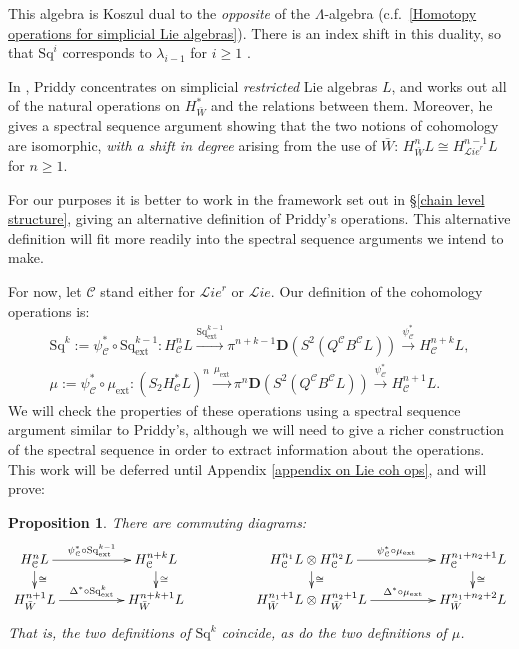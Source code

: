 \documentclass[11pt]{amsart} \renewcommand{\baselinestretch}{1.2}
\theoremstyle{plain}
\newtheorem{prop}[thm]{Proposition}
\numberwithin{equation}{section} %
\theoremstyle{plain}
\newtheorem{prop}[thm]{Proposition}
\numberwithin{equation}{chapter} %
\renewcommand{\to}{\longrightarrow}
\newcommand{\scrL}{\mathscr{L}}
\newcommand{\calc}{\mathcal{C}}
\newcommand{\citeBOX}[2][]{\cite[\mbox{#1}]{#2}}
\newcommand{\ExtCohOp}{\mathrm{Sq}_\mathrm{ext}}
\newcommand{\ExtCohProd}{\mu_\mathrm{ext}}
\newcommand{\Sq}{\mathrm{Sq}}
\newcommand{\liealgs}{{\scrL\!\textit{ie}}}
\newcommand{\restliealgs}{{\scrL\!\textit{ie}^\textit{r}}}
\newcommand{\dual}{\mathbf{D}}
\begin{document}
\begin{Constructing cohomology operations}
This algebra is Koszul dual to the \emph{opposite} of the $\Lambda$-algebra (c.f.\ \ref{Homotopy operations for simplicial Lie algebras}). There is an index shift in this duality, so that $\Sq^i$ corresponds to $\lambda_{i-1}$ for $i\geq1$ \citeBOX[\S7.1]{PriddyKoszul.pdf}.

In \cite{PriddySimplicialLie.pdf}, Priddy concentrates on simplicial \emph{restricted} Lie algebras $L$, and works out all of the natural operations on $H^*_{\bar{W}}$ and the relations between them. Moreover, he gives a spectral sequence argument showing that the two notions of cohomology are isomorphic, \emph{with a shift in degree} arising from the use of $\bar{W}$: $H_{\bar{W}}^nL\cong H^{n-1}_{\restliealgs}L$ for $n\geq1$.

For our purposes it is better to work in the framework set out in \S\ref{chain level structure}, giving an alternative definition of Priddy's operations. This alternative definition will fit more readily into the spectral sequence arguments we intend to make. 

For now, let $\calc$ stand either for $\restliealgs$ or $\liealgs$. Our definition of the cohomology operations is:
\begin{gather*}
\Sq^k:=\psi^*_{\calc}\circ\ExtCohOp^{k-1}:H_\calc^{n}L\overset{\ExtCohOp^{k-1}}{\to} \pi^{n+k-1}\dual(S^2(Q^\calc B^\calc L))\overset{\psi_\calc^*}{\to} H_\calc^{n+k}L,\\
\mu:=\psi^*_{\calc}\circ\ExtCohProd:(S_2 H_\calc^{*}L)^{n}\overset{\ExtCohProd}{\to} \pi^{n}\dual(S^2(Q^\calc B^\calc L))\overset{\psi_\calc^*}{\to} H_\calc^{n+1}L.
\end{gather*}
We will check the properties of these operations using a spectral sequence argument similar to Priddy's, although we will need to give a richer construction of the spectral sequence in order to extract information about the operations. This work will be deferred until Appendix \ref{appendix on Lie coh ops}, and will prove:
\begin{prop}
\label{all the lie steenrod ops are the same}
There are commuting diagrams:
\[\xymatrix@R=4mm@C=17mm{
H^n_\calc L
\ar[d]^-{\cong}
\ar[r]^-{\psi^*_{\calc}\circ\ExtCohOp^{k-1}}&%
H^{n+k}_\calc L
\ar[d]^-{\cong}
&
H^{n_1}_\calc L\otimes H^{n_2}_\calc L
\ar[d]^-{\cong}
\ar[r]^-{\psi^*_{\calc}\circ\ExtCohProd}&%
H^{n_1+n_2+1}_\calc L
\ar[d]^-{\cong}
\\%
H^{n+1}_{\bar{W}} L
\ar[r]^-{\Delta^*\circ\ExtCohOp^k}&%
H^{n+k+1}_{\bar{W}} L%
&
H^{n_1+1}_{\bar{W}} L\otimes H^{n_2+1}_{\bar{W}} L
\ar[r]^-{\Delta^*\circ\ExtCohProd}&%
H^{n_1+n_2+2}_{\bar{W}} L%
}\]
That is, the two definitions of $\Sq^k$ coincide, as do the two definitions of $\mu$.
\end{prop}


\end{Constructing cohomology operations}
\end{document}
